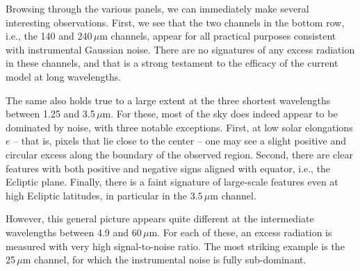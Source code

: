 \documentclass{aa}
\renewcommand{\a}[0]{\vec{a}}
\begin{document}


Browsing through the various panels, we can immediately make several
interesting observations. First, we see that the two channels in the
bottom row, i.e., the 140 and 240$\,\mu$m channels, appear for all
practical purposes consistent with instrumental Gaussian noise. There
are no signatures of any excess radiation in these channels, and that
is a strong testament to the efficacy of the current model at long
wavelengths.

The same also holds true to a large extent at the three shortest
wavelengths between 1.25 and 3.5$\,\mu$m. For these, most of the sky
does indeed appear to be dominated by noise, with three notable
exceptions. First, at low solar elongations $e$ -- that is, pixels
that lie close to the center -- one may see a slight positive and
circular excess along the boundary of the observed region. Second,
there are clear features with both positive and negative signs aligned
with equator, i.e., the Ecliptic plane. Finally, there is a faint
signature of large-scale features even at high Ecliptic latitudes, in
particular in the $3.5\,\mu$m channel.



However, this general picture appears quite different at the
intermediate wavelengths between 4.9 and 60$\,\mu$m. For each of
these, an excess radiation is measured with very high signal-to-noise
ratio. The most striking example is the 25\,$\mu$m channel, for which
the instrumental noise is fully sub-dominant.
\end{document}
